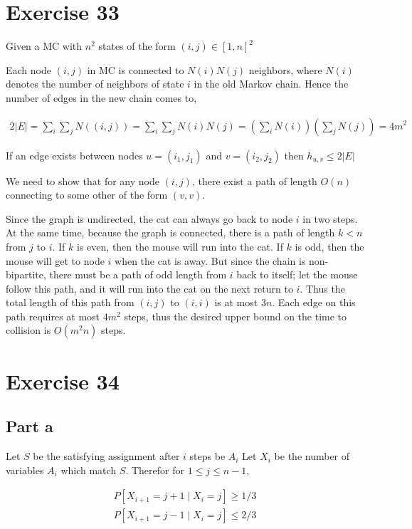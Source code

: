 \documentclass[12pt, a4paper]{article}
\begin{document}
\section{Exercise 33}
Given a MC with $n^2$ states of the form $(i,j) \in [1,n]^2$

Each node $(i,j)$ in MC is connected to $N(i)N(j)$ neighbors, where $N(i)$ denotes
the number of neighbors of state $i$ in the old Markov chain. Hence the number
of edges in the new chain comes to,

\begin{align*}
  2|E| = \sum_i\sum_j N((i,j)) = \sum_i\sum_j N(i)N(j) = \left( \sum_i N(i) \right) \left( \sum_j N(j)\right) = 4m^2
\end{align*}

If an edge exists between nodes $u = (i_1, j_1)$ and $v = (i_2, j_2)$ then
$h_{u,v} \leq 2|E|$

We need to show that for any node $(i,j)$, there exist a path of length $O(n)$
connecting to some other of the form $(v,v)$.

Since the graph is undirected, the cat can always go back to node $i$ in two
steps. At the same time, because the graph is connected, there is a path of length $k < n$ from $j$ to $i$. If $k$ is even, then the mouse will run into the cat. If $k$ is odd,
then the mouse will get to node $i$ when the cat is away. But since the chain is
non-bipartite, there must be a path of odd length from $i$ back to itself; let
the mouse follow this path, and it will run into the cat on the next return to
$i$. Thus the total length of this path from $(i, j)$ to $(i, i)$ is at most
$3n$. Each edge on this path requires at most $4m^2$ steps, thus the desired
upper bound on the time to collision is $O(m^2n)$ steps.

\section{Exercise 34}
\subsection{Part a}
Let $S$ be the satisfying assignment after $i$ steps be $A_i$
Let $X_i$ be the number of variables $A_i$ which match $S$. Therefor for $1 \leq
j \leq n - 1$,

\begin{align*}
  P[X_{i+1} = j + 1 \mid X_i = j] \geq 1/3\\
  P[X_{i+1} = j - 1 \mid X_i = j] \leq 2/3\\
\end{align*}
\end{document}
